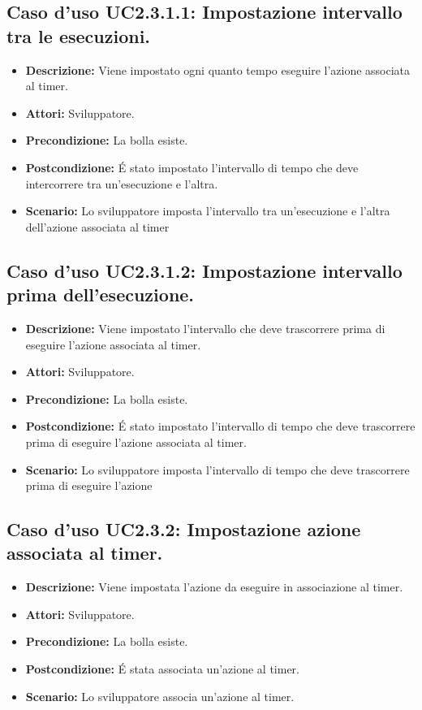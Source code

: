 \subsection{Caso d'uso UC2.3.1.1: Impostazione intervallo tra le esecuzioni.}
\begin{itemize}
\item[]\textbf{Descrizione:} Viene impostato ogni quanto tempo eseguire l'azione associata al timer.
\item[]\textbf{Attori:} Sviluppatore. 
\item[]\textbf{Precondizione:} La bolla esiste. 
\item[]\textbf{Postcondizione:} \'E stato impostato l'intervallo di tempo che deve intercorrere tra un'esecuzione e l'altra. 
\item[]\textbf{Scenario:}
Lo sviluppatore imposta l'intervallo tra un'esecuzione e l'altra dell'azione associata al timer 
\end{itemize}

\subsection{Caso d'uso UC2.3.1.2: Impostazione intervallo prima dell'esecuzione.}
\begin{itemize}
\item[]\textbf{Descrizione:} Viene impostato l'intervallo che deve  trascorrere prima di eseguire l'azione associata al timer.
\item[]\textbf{Attori:} Sviluppatore. 
\item[]\textbf{Precondizione:} La bolla esiste. 
\item[]\textbf{Postcondizione:} \'E stato impostato l'intervallo di tempo che deve trascorrere prima di eseguire l'azione associata al timer. 
\item[]\textbf{Scenario:}
Lo sviluppatore imposta l'intervallo di tempo che deve trascorrere prima di eseguire l'azione 
\end{itemize}

\subsection{Caso d'uso UC2.3.2: Impostazione azione associata al timer.}
\begin{itemize}
\item[]\textbf{Descrizione:} Viene impostata l'azione da eseguire in associazione al timer.
\item[]\textbf{Attori:} Sviluppatore. 
\item[]\textbf{Precondizione:} La bolla esiste. 
\item[]\textbf{Postcondizione:} \'E stata associata un'azione al timer. 
\item[]\textbf{Scenario:}
Lo sviluppatore associa un'azione al timer. 
\end{itemize}

